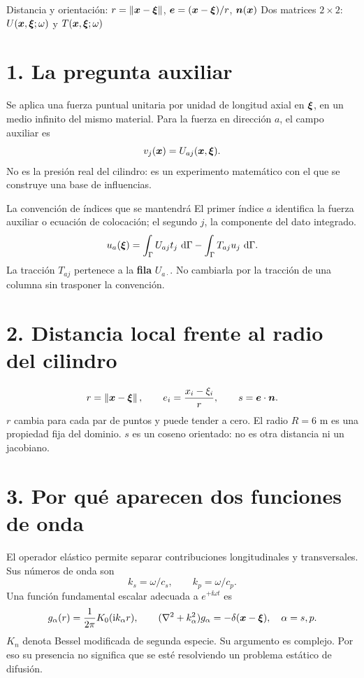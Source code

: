 \documentclass[11pt]{article}
\begin{document}
\base
{}
{Distancia y orientación: \(r=\left\lVert\bm{x}-\bm{\xi}\right\rVert\), \(\bm{e}=(\bm{x}-\bm{\xi})/r\), \(\bm{n}(\bm{x})\)}
{Dos matrices \(2\times2\): \(U(\bm{x},\bm{\xi};\omega)\) y \(T(\bm{x},\bm{\xi};\omega)\)}

\section*{1. La pregunta auxiliar}
Se aplica una fuerza puntual unitaria por unidad de longitud axial en
\(\bm{\xi}\), en un medio infinito del mismo material. Para la fuerza en
dirección \(a\), el campo auxiliar es
\[
 v_j(\bm{x})=U_{aj}(\bm{x},\bm{\xi}).
\]
No es la presión real del cilindro: es un experimento matemático con el que
se construye una base de influencias.

\begin{idea}{La convención de índices que se mantendrá}
El primer índice \(a\) identifica la fuerza auxiliar o ecuación de colocación;
el segundo \(j\), la componente del dato integrado.
\[
 u_a(\bm{\xi})=\int_\Gamma U_{aj}t_j\,\,\mathrm{d}\Gamma
              -\int_\Gamma T_{aj}u_j\,\,\mathrm{d}\Gamma.
\]
La tracción \(T_{aj}\) pertenece a la \textbf{fila} \(U_{a\cdot}\).
No cambiarla por la tracción de una columna sin trasponer la convención.
\end{idea}

\section*{2. Distancia local frente al radio del cilindro}
\[
 r=\left\lVert\bm{x}-\bm{\xi}\right\rVert,\qquad e_i=\frac{x_i-\xi_i}{r},\qquad
 s=\bm{e}\cdot\bm{n}.
\]
\(r\) cambia para cada par de puntos y puede tender a cero.
El radio \(R=6\) m es una propiedad fija del dominio.
\(s\) es un coseno orientado: no es otra distancia ni un jacobiano.

\newpage
\section*{3. Por qué aparecen dos funciones de onda}
El operador elástico permite separar contribuciones longitudinales y
transversales. Sus números de onda son
\[
 k_s=\omega/c_s,\qquad k_p=\omega/c_p.
\]
Una función fundamental escalar adecuada a \(e^{+\ii\omega t}\) es
\[
 g_\alpha(r)=\frac{1}{2\pi}K_0(\mathrm{i} k_\alpha r),\qquad
 (\nabla^2+k_\alpha^2)g_\alpha=-\delta(\bm{x}-\bm{\xi}),
 \quad\alpha=s,p.
\]
\(K_n\) denota Bessel modificada de segunda especie. Su argumento es
complejo. Por eso su presencia no significa que se esté resolviendo un
problema estático de difusión.
\end{document}
